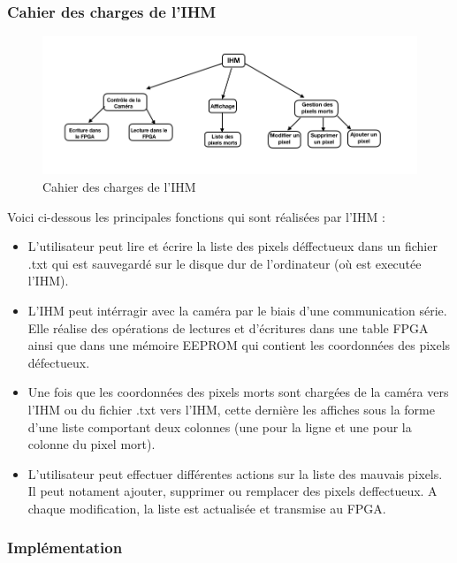 \subsubsection{Cahier des charges de l'IHM } 

\begin{figure}[ht]
	\centering
    \includegraphics[scale=0.5]{img/cdcIHM.png}
    \caption{Cahier des charges de l'IHM}
    \label{fig:mavgen}
\end{figure}

Voici ci-dessous les principales fonctions qui sont réalisées par l'IHM : 
\newline
\begin{itemize}
	\item L'utilisateur peut lire et écrire la liste des pixels déffectueux dans un fichier .txt qui est sauvegardé sur le disque dur de l'ordinateur (où est executée l'IHM). 
	\item L'IHM peut intérragir avec la caméra par le biais d'une communication série. Elle réalise des opérations de lectures et d'écritures dans une table FPGA ainsi que dans une mémoire EEPROM qui contient les coordonnées des pixels défectueux. 
	\item Une fois que les coordonnées des pixels morts sont chargées de la caméra vers l'IHM ou du fichier .txt vers l'IHM, cette dernière les affiches sous la forme d'une liste comportant deux colonnes (une pour la ligne et une pour la colonne du pixel mort). 
	\item L'utilisateur peut effectuer différentes actions sur la liste des mauvais pixels. Il peut notament ajouter, supprimer ou remplacer des pixels deffectueux. A chaque modification, la liste est actualisée et transmise au FPGA.

\end{itemize}

\subsubsection{Implémentation}

